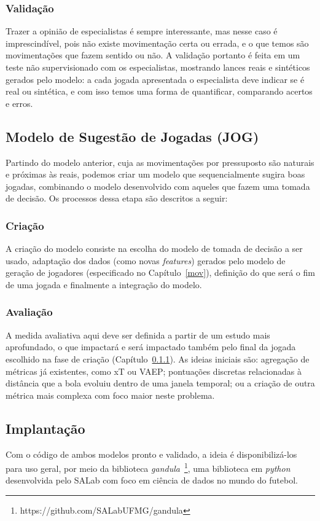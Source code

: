 \documentclass[12pt]{article}
\begin{document}
\subsubsection{Validação}\label{mov:val}
Trazer a opinião de especialistas é sempre interessante, mas nesse caso é imprescindível, pois não existe movimentação certa ou errada, e o que temos são movimentações que fazem sentido ou não. A validação portanto é feita em um teste não supervisionado com os especialistas, mostrando lances reais e sintéticos gerados pelo modelo: a cada jogada apresentada o especialista deve indicar se é real ou sintética, e com isso temos uma forma de quantificar, comparando acertos e erros. 

\subsection{Modelo de Sugestão de Jogadas (JOG)}\label{jog}
Partindo do modelo anterior, cuja as movimentações por pressuposto são naturais e próximas às reais, podemos criar um modelo que sequencialmente sugira boas jogadas, combinando o modelo desenvolvido com aqueles que fazem uma tomada de decisão. Os processos dessa etapa são descritos a seguir: 

\subsubsection{Criação}\label{jog:cri}
A criação do modelo consiste na escolha do modelo de tomada de decisão a ser usado, adaptação dos dados (como novas \textit{features}) gerados pelo modelo de geração de jogadores (especificado no Capítulo~\ref{mov}), definição do que será o fim de uma jogada e finalmente a integração do modelo. 

\subsubsection{Avaliação}\label{jog:aval}
A medida avaliativa aqui deve ser definida a partir de um estudo mais aprofundado, o que impactará e será impactado também pelo final da jogada escolhido na fase de criação (Capítulo~\ref{jog:cri}). As ideias iniciais são: agregação de métricas já existentes, como xT ou VAEP; pontuações discretas relacionadas à distância que a bola evoluiu dentro de uma janela temporal; ou a criação de outra métrica mais complexa com foco maior neste problema. 

\subsection{Implantação}\label{imp}
Com o código de ambos modelos pronto e validado, a ideia é disponibilizá-los para uso geral, por meio da biblioteca \textit{gandula}~\footnote{https://github.com/SALabUFMG/gandula}, uma biblioteca em \textit{python} desenvolvida pelo SALab com foco em ciência de dados no mundo do futebol. 
\end{document}

